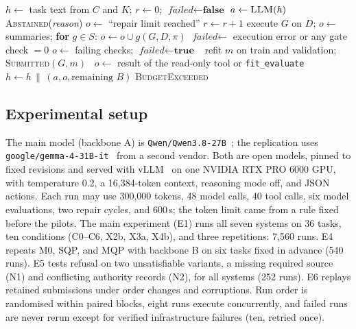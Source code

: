 \documentclass[conference]{IEEEtran}
\newcommand{\sys}[1]{\textsf{#1}}
\begin{document}
\begin{algorithm}[t]
\caption{One agentic run of system $s$ with gate set $S$ on instance $I$}
\label{alg:run}
\footnotesize
\begin{algorithmic}[1]
\State $h\gets$ task text from $C$ and $K$; $r\gets0$; $\textit{failed}\gets\textbf{false}$
  \State $a\gets\textsc{LLM}(h)$ 
   \Return \textsc{Abstained}(\textit{reason}) \EndIf
     $o\gets$ ``repair limit reached''
    \Else
       $r\gets r+1$ \EndIf
      \State execute $G$ on $D$; $o\gets$ summaries; \textbf{for} $g\in S$: $o\gets o\cup g(G,D,\pi)$
      \State $\textit{failed}\gets$ execution error or any gate check $=0$
    \EndIf
     $o\gets$ failing checks; $\textit{failed}\gets\textbf{true}$
    \Else\ refit $m$ on train and validation; \Return \textsc{Submitted}$(G,m)$
    \EndIf
  \Else\ $o\gets$ result of the read-only tool or \texttt{fit\_evaluate}
  \EndIf
  \State $h\gets h\,\|\,(a,o,\text{remaining }B)$
\EndWhile
\State \Return \textsc{BudgetExceeded}
\end{algorithmic}
\end{algorithm}

\subsection{Experimental setup}
The main model (backbone A) is \texttt{Qwen/Qwen3.8-27B}~\cite{qwen2026qwen38}; the replication uses
\texttt{google/gemma-4-31B-it}~\cite{google2026gemma4} from a second vendor. Both are open models, pinned to fixed
revisions and served with vLLM~\cite{kwon2023vllm} on one NVIDIA RTX PRO 6000 GPU, with temperature 0.2, a
16,384-token context, reasoning mode off, and JSON actions. Each run may use 300,000 tokens, 48 model calls, 40 tool
calls, six model evaluations, two repair cycles, and 600\,s; the token limit came from a rule fixed before the pilots.
The main experiment (E1) runs all seven systems on 36 tasks, ten conditions (C0--C6, X2b, X3a, X4b), and three
repetitions: 7,560 runs. E4 repeats \sys{M0}, \sys{SQP}, and \sys{MQP} with backbone B on six tasks fixed in advance
(540 runs). E5 tests refusal on two unsatisfiable variants, a missing required source (N1) and conflicting authority
records (N2), for all systems (252 runs). E6 replays retained submissions under order changes and corruptions. Run
order is randomised within paired blocks, eight runs execute concurrently, and failed runs are never rerun except
for verified infrastructure failures (ten, retried once).
\end{document}
